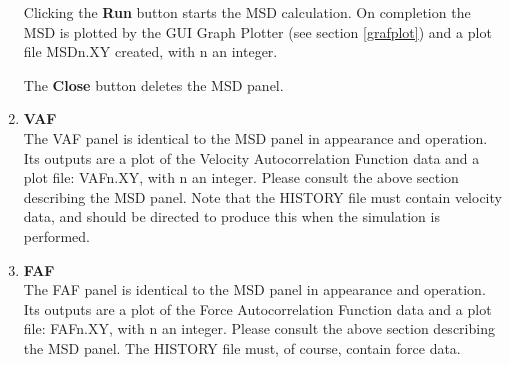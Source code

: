\begin{enumerate}
Clicking the {\bf Run} button starts the MSD calculation. On
completion the MSD is plotted by the GUI Graph Plotter (see section
\ref{grafplot}) and a plot file MSDn.XY created, with n an integer.

The {\bf Close} button deletes the MSD panel.
\item {\bf VAF}\\
The VAF panel is identical to the MSD panel in appearance and
operation. Its outputs are a plot of the Velocity Autocorrelation
Function data and a plot file: VAFn.XY, with n an integer. Please
consult the above section describing the MSD panel. Note that the
HISTORY file must contain velocity data, and \DD{} should be directed to
produce this when the simulation is performed.

\item {\bf FAF}\\
The FAF panel is identical to the MSD panel in appearance and
operation. Its outputs are a plot of the Force Autocorrelation
Function data and a plot file: FAFn.XY, with n an integer. Please
consult the above section describing the MSD panel. The HISTORY file
must, of course, contain force data.
\end{enumerate}
